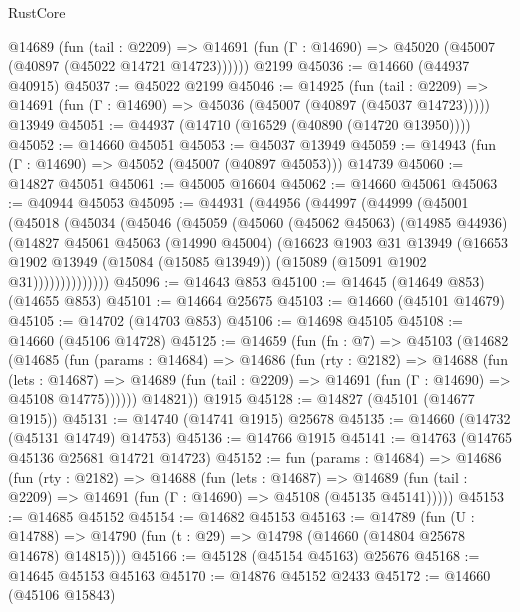 \begin{lexlean}{RustCore}
\begin{coremodule}
    @14689
      (fun (tail : @2209) =>
      @14691 (fun (Γ : @14690) => @45020 (@45007 (@40897 (@45022 @14721 @14723))))))
    @2199
@45036 := @14660 (@44937 @40915)
@45037 := @45022 @2199
@45046 := @14925
    (fun (tail : @2209) => @14691 (fun (Γ : @14690) => @45036 (@45007 (@40897 (@45037 @14723)))))
    @13949
@45051 := @44937 (@14710 (@16529 (@40890 (@14720 @13950))))
@45052 := @14660 @45051
@45053 := @45037 @13949
@45059 := @14943 (fun (Γ : @14690) => @45052 (@45007 (@40897 @45053))) @14739
@45060 := @14827 @45051
@45061 := @45005 @16604
@45062 := @14660 @45061
@45063 := @40944 @45053
@45095 := @44931
    (@44956
      (@44997
        (@44999
          (@45001
            (@45018
              (@45034
                (@45046
                  (@45059
                    (@45060
                      (@45062 @45063)
                      (@14985 @44936)
                      (@14827
                        @45061
                        @45063
                        (@14990 @45004)
                        (@16623
                          @1903
                          @31
                          @13949
                          (@16653
                            @1902
                            @13949
                            (@15084 (@15085 @13949))
                            (@15089 (@15091 @1902 @31))))))))))))))
@45096 := @14643 @853
@45100 := @14645 (@14649 @853) (@14655 @853)
@45101 := @14664 @25675
@45103 := @14660 (@45101 @14679)
@45105 := @14702 (@14703 @853)
@45106 := @14698 @45105
@45108 := @14660 (@45106 @14728)
@45125 := @14659
    (fun (fn : @7) =>
    @45103
      (@14682
        (@14685
          (fun (params : @14684) =>
          @14686
            (fun (rty : @2182) =>
            @14688
              (fun (lets : @14687) =>
              @14689 (fun (tail : @2209) => @14691 (fun (Γ : @14690) => @45108 @14775))))))
        @14821))
    @1915
@45128 := @14827 (@45101 (@14677 @1915))
@45131 := @14740 (@14741 @1915) @25678
@45135 := @14660 (@14732 (@45131 @14749) @14753)
@45136 := @14766 @1915
@45141 := @14763 (@14765 @45136 @25681 @14721 @14723)
@45152 := fun (params : @14684) =>
  @14686
    (fun (rty : @2182) =>
    @14688
      (fun (lets : @14687) =>
      @14689 (fun (tail : @2209) => @14691 (fun (Γ : @14690) => @45108 (@45135 @45141)))))
@45153 := @14685 @45152
@45154 := @14682 @45153
@45163 := @14789
    (fun (U : @14788) => @14790 (fun (t : @29) => @14798 (@14660 (@14804 @25678 @14678) @14815)))
@45166 := @45128 (@45154 @45163) @25676
@45168 := @14645 @45153 @45163
@45170 := @14876 @45152 @2433
@45172 := @14660 (@45106 @15843)

\end{coremodule}
\end{lexlean}
